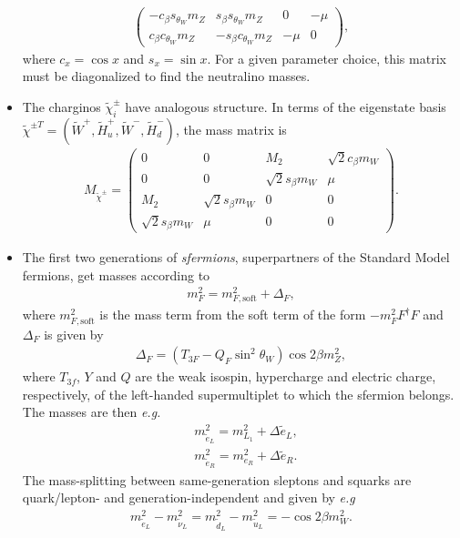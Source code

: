 \documentclass[twoside,english]{uiofysmaster}
\begin{document}
\begin{itemize}
\begin{align}
\begin{pmatrix}
 			- c_\beta s_{\theta_W} m_Z &  s_\beta s_{\theta_W} m_Z & 0 & -\mu \\
			 c_\beta c_{\theta_W} m_Z & - s_\beta c_{\theta_W} m_Z & -\mu & 0
 		\end{pmatrix},
 	\end{align}
 	where $c_x = \cos x$ and $s_x = \sin x$. For a given parameter choice, this matrix must be diagonalized to find the neutralino masses.
 	\item The charginos $\tilde\chi_i^\pm$ have analogous structure. In terms of the eigenstate basis $\tilde \chi^{\pm T} = (\tilde W^+, \tilde H_u^+, \tilde W^-, \tilde H_d^-)$, the mass matrix is
 	\begin{align}
 		M_{\tilde \chi^\pm} = \begin{pmatrix}
 			0 & 0 & M_2 & \sqrt{2} c_\beta m_W  \\
 			0 & 0 & \sqrt{2} s_\beta m_W & \mu \\
 			M_2 & \sqrt{2} s_\beta m_W & 0 & 0\\
 			\sqrt{2} s_\beta m_W & \mu & 0 & 0
 		\end{pmatrix}.
 	\end{align}
 	\item The first two generations of {\it sfermions}, superpartners of the Standard Model fermions, get masses according to
 	\begin{align}
 		m^2_F = m^2_{F,\mathrm{soft}} + \Delta_F,
 	\end{align}
 	where $m^2_{F,\mathrm{soft}}$ is the mass term from the soft term of the form $-m^2_F F^\dag F$ and $\Delta_F$ is given by
 	\begin{align}
 		\Delta_F = (T_{3F} - Q_F \sin^2\theta_W)\cos 2\beta m^2_Z,
 	\end{align}
 	where $T_{3f}$, $Y$ and $Q$ are the weak isospin, hypercharge and electric charge, respectively, of the left-handed supermultiplet to which the sfermion belongs. The masses are then {\it e.g.}\
 	\begin{align}
 		&m^2_{\tilde e_L} = m^2_{L_1} + \Delta \tilde e_L,\\
 		&m^2_{\tilde e_R} = m^2_{e_R} + \Delta \tilde e_R.
 	\end{align}
 	The mass-splitting between same-generation sleptons and squarks are quark/lepton- and generation-independent and given by {\it e.g}
 	\begin{align}
 		m^2_{\tilde e_L} - m^2_{\tilde \nu_L} = m^2_{\tilde d_L} - m^2_{\tilde u_L} = -\cos 2\beta m_W^2.

\end{align}
\end{itemize}
\end{document}
